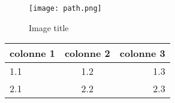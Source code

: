 \begin{figure}[h!]
	\center
	\texttt{[image: path.png]}
	\caption{Image title}
	\label{fig:figure}
\end{figure}


\begin{tabular}{|l|c|r|}
	\hline
	colonne 1 & colonne 2 & colonne 3 \\
	\hline
	1.1 & 1.2 & 1.3 \\
	2.1 & 2.2 & 2.3 \\
	\hline
\end{tabular}